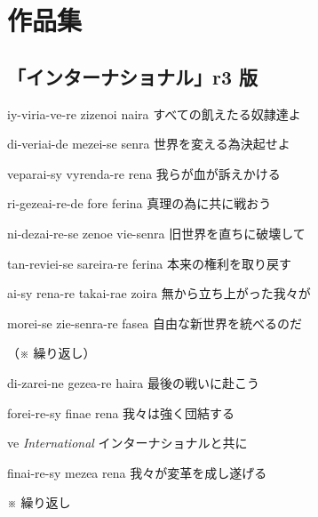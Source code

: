 \chapter{作品集}

\section{「インターナショナル」r3 版}

\lyric
{iy-viria-ve-re zizenoi naira}
{すべての飢えたる奴隷達よ}

\lyric
{di-veriai-de mezei-se senra}
{世界を変える為決起せよ}

\lyric
{veparai-sy vyrenda-re rena}
{我らが血が訴えかける}

\lyric
{ri-gezeai-re-de fore ferina}
{真理の為に共に戦おう}

\lyric
{ni-dezai-re-se zenoe vie-senra}
{旧世界を直ちに破壊して}

\lyric
{tan-reviei-se sareira-re ferina}
{本来の権利を取り戻す}

\lyric
{ai-sy rena-re takai-rae zoira}
{無から立ち上がった我々が}

\lyric
{morei-se zie-senra-re fasea}
{自由な新世界を統べるのだ}

（※ 繰り返し）

\lyric
{di-zarei-ne gezea-re haira}
{最後の戦いに赴こう}

\lyric
{forei-re-sy finae rena}
{我々は強く団結する}

\lyric
{ve \emph{International}}
{インターナショナルと共に}

\lyric
{finai-re-sy mezea rena}
{我々が変革を成し遂げる}

※ 繰り返し